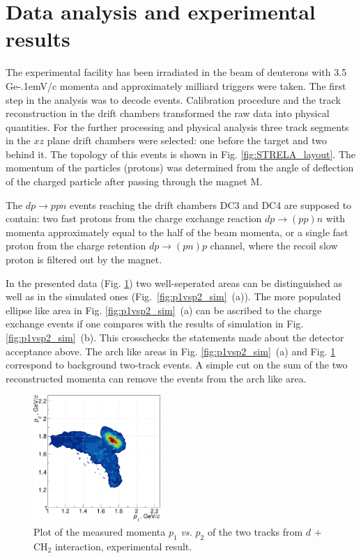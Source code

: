 \documentclass[twocolumn,epjc3]{svjour3}
\newcommand{\dpfrag} {\ensuremath{dp \rightarrow ppn}\xspace}
\newcommand{\dpchex} {\ensuremath{dp \rightarrow (pp)n}\xspace}
\newcommand{\dpret}  {\ensuremath{dp \rightarrow (pn)p}\xspace}
\newcommand{\GeVc}   {Ge\kern-.1emV/c\xspace}
\begin{document}
\section{Data analysis and experimental results}
The experimental facility has been irradiated in the beam of deuterons with 3.5
\GeVc momenta and approximately milliard triggers were taken. The first step in
the analysis was to decode events. Calibration procedure and the track
reconstruction in the drift chambers transformed the raw data into physical
quantities. For the further processing and physical analysis three track
segments in the $xz$ plane drift chambers were selected: one before the target
and two behind it. The topology of this events is shown in
Fig. \ref{fig:STRELA_layout}. The momentum of the particles (protons) was
determined from the angle of deflection of the charged particle after passing
through the magnet M.

The \dpfrag events reaching the drift chambers DC3 and DC4 are supposed to
contain: two fast protons from the charge exchange reaction \dpchex with momenta
approximately equal to the half of the beam momenta, or a single fast proton
from the charge retention \dpret channel, where the recoil slow proton is
filtered out by the magnet.

In the presented data (Fig. \ref{fig:p1vsp2_exp}) two well-seperated areas can
be distinguished as well as in the simulated ones
(Fig.~\ref{fig:p1vsp2_sim}~(a)). The more populated ellipse like area in
Fig. \ref{fig:p1vsp2_sim}~(a) can be ascribed to the charge exchange events if
one compares with the results of simulation in
Fig. \ref{fig:p1vsp2_sim}~(b). This crosschecks the statements made about the
detector acceptance above. The arch like areas in Fig. \ref{fig:p1vsp2_sim}~(a)
and Fig. \ref{fig:p1vsp2_exp} correspond to background two-track events. A
simple cut on the sum of the two reconstructed momenta can remove the events
from the arch like area.

\begin{figure}[h]
  \centering
  \includegraphics[width=0.43\textwidth]{p1_vs_p2_2.pdf}
  \caption{Plot of the measured momenta $p_1$ \textit{vs.} $p_2$ of the two
    tracks from $d$ + CH$_{2}$ interaction, experimental result.}
  \label{fig:p1vsp2_exp}
\end{figure}
\end{document}
